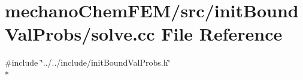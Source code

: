 \section{mechano\-Chem\-F\-E\-M/src/init\-Bound\-Val\-Probs/solve.cc File Reference}
\label{solve_8cc}
{\ttfamily \#include \char`\"{}../../include/init\-Bound\-Val\-Probs.\-h\char`\"{}}\\*
